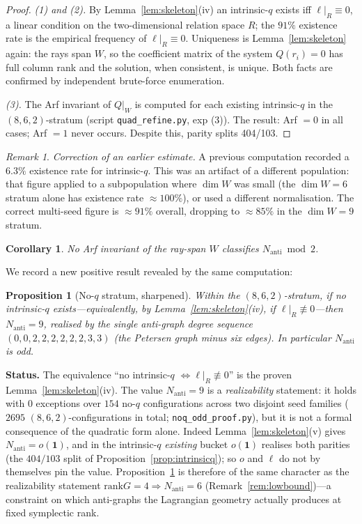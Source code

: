 \documentclass[11pt,a4paper]{article}
\newtheorem{corollary}[theorem]{Corollary}
\newtheorem{proposition}[theorem]{Proposition}
\theoremstyle{remark}
\newtheorem{remark}[theorem]{Remark}
\newcommand{\rank}{\mathrm{rank}}
\newcommand{\Nanti}{N_{\mathrm{anti}}}
\begin{document}
\begin{proof}
\emph{(1) and (2).}  By Lemma~\ref{lem:skeleton}(iv) an intrinsic-$q$ exists iff
$\ell|_R\equiv0$, a linear condition on the two-dimensional relation space $R$; the
$91\%$ existence rate is the empirical frequency of $\ell|_R\equiv0$.  Uniqueness is
Lemma~\ref{lem:skeleton} again: the rays span $W$, so the coefficient matrix of the
system $Q(r_i)=0$ has full column rank and the solution, when consistent, is unique.
Both facts are confirmed by independent brute-force enumeration.

\emph{(3).}  The Arf invariant of $Q|_W$ is computed for each existing intrinsic-$q$
in the $(8,6,2)$-stratum (script \texttt{quad\_refine.py}, exp (3)).  The result:
Arf $=0$ in all cases; Arf $=1$ never occurs.
Despite this, parity splits 404/103.
\end{proof}

\begin{remark}
\emph{Correction of an earlier estimate.}  A previous computation recorded a $6.3\%$
existence rate for intrinsic-$q$.  This was an artifact of a different population:
that figure applied to a subpopulation where $\dim W$ was small (the $\dim W=6$ stratum
alone has existence rate $\approx100\%$), or used a different normalisation.  The
correct multi-seed figure is $\approx91\%$ overall, dropping to $\approx85\%$ in the
$\dim W=9$ stratum.
\end{remark}

\begin{corollary}
No Arf invariant of the ray-span $W$ classifies $\Nanti\bmod2$.
\end{corollary}

We record a new positive result revealed by the same computation:

\begin{proposition}[No-$q$ stratum, sharpened]\label{prop:noq_odd}
Within the $(8,6,2)$-stratum, if no intrinsic-$q$ exists---equivalently, by
Lemma~\ref{lem:skeleton}(iv), if $\ell|_R\not\equiv0$---then $\Nanti=9$, realised by
the single anti-graph degree sequence $(0,0,2,2,2,2,2,2,3,3)$ (the Petersen graph
minus six edges). In particular $\Nanti$ is odd.
\end{proposition}

\noindent\textbf{Status.}  The equivalence ``no intrinsic-$q$
$\iff\ell|_R\not\equiv0$'' is the proven Lemma~\ref{lem:skeleton}(iv). The value
$\Nanti=9$ is a \emph{realizability} statement: it holds with $0$ exceptions over
$154$ no-$q$ configurations across two disjoint seed families ($2695$
$(8,6,2)$-configurations in total; \texttt{noq\_odd\_proof.py}), but it is not a
formal consequence of the quadratic form alone. Indeed
Lemma~\ref{lem:skeleton}(v) gives $\Nanti=o(\mathbf 1)$, and in the intrinsic-$q$
\emph{existing} bucket $o(\mathbf 1)$ realises both parities (the
$404/103$ split of Proposition~\ref{prop:intrinsicq}); so $o$ and $\ell$ do not by
themselves pin the value. Proposition~\ref{prop:noq_odd} is therefore of the same
character as the realizability statement $\rank G=4\Rightarrow\Nanti=6$
(Remark~\ref{rem:lowbound})---a constraint on which anti-graphs the Lagrangian
geometry actually produces at fixed symplectic rank.
\end{document}
